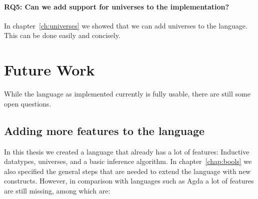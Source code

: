 \paragraph{RQ5: Can we add support for universes to the implementation?}
In chapter~\ref{ch:universes} we showed that we can add universes to the language. This can be done easily and concisely.

\section{Future Work}
While the language as implemented currently is fully usable, there are still some open questions. 

\subsection*{Adding more features to the language}

In this thesis we created a language that already has a lot of features: Inductive datatypes, universes, and a basic inference algorithm. In chapter~\ref{chap:bools} we also specified the general steps that are needed to extend the language with new constructs. However, in comparison with languages such as Agda a lot of features are still missing, among which are:

